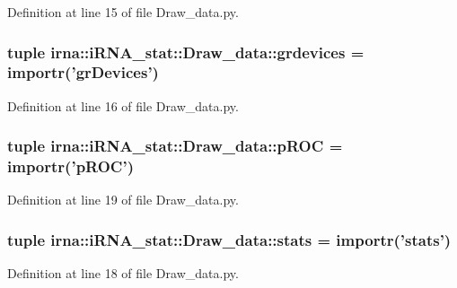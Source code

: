 \-Definition at line 15 of file \-Draw\-\_\-data.\-py.

\hypertarget{namespaceirna_1_1iRNA__stat_1_1Draw__data_a1df1981d191b6cafaddc7b81285f6e2f}{
\subsubsection[{grdevices}]{\setlength{\rightskip}{0pt plus 5cm}tuple {\bf irna\-::i\-R\-N\-A\-\_\-stat\-::\-Draw\-\_\-data\-::grdevices} = importr('gr\-Devices')}}
\label{namespaceirna_1_1iRNA__stat_1_1Draw__data_a1df1981d191b6cafaddc7b81285f6e2f}


\-Definition at line 16 of file \-Draw\-\_\-data.\-py.

\hypertarget{namespaceirna_1_1iRNA__stat_1_1Draw__data_ae0090f589c9502cf4ad628761a28aa81}{
\subsubsection[{p\-R\-O\-C}]{\setlength{\rightskip}{0pt plus 5cm}tuple {\bf irna\-::i\-R\-N\-A\-\_\-stat\-::\-Draw\-\_\-data\-::p\-R\-O\-C} = importr('{\bf p\-R\-O\-C}')}}
\label{namespaceirna_1_1iRNA__stat_1_1Draw__data_ae0090f589c9502cf4ad628761a28aa81}


\-Definition at line 19 of file \-Draw\-\_\-data.\-py.

\hypertarget{namespaceirna_1_1iRNA__stat_1_1Draw__data_a6bb98bb35332ca13e7328cb82458e58b}{
\subsubsection[{stats}]{\setlength{\rightskip}{0pt plus 5cm}tuple {\bf irna\-::i\-R\-N\-A\-\_\-stat\-::\-Draw\-\_\-data\-::stats} = importr('{\bf stats}')}}
\label{namespaceirna_1_1iRNA__stat_1_1Draw__data_a6bb98bb35332ca13e7328cb82458e58b}


\-Definition at line 18 of file \-Draw\-\_\-data.\-py.

